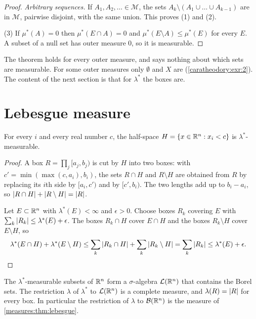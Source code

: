\begin{notechapter}
\begin{proof}
\emph{Arbitrary sequences.} If $A_1, A_2, \dots\in\mathcal M$, the
sets $A_k\setminus(A_1\cup\dots\cup A_{k-1})$ are in $\mathcal M$,
pairwise disjoint, with the same union. This proves (1) and (2).

(3) If $\mu^*(A) = 0$ then $\mu^*(E\cap A) = 0$ and
$\mu^*(E\setminus A)\leq\mu^*(E)$ for every $E$. A subset of a null set
has outer measure $0$, so it is measurable.
\end{proof}

The theorem holds for every outer measure, and says nothing about
which sets are measurable. For some outer measures only $\emptyset$ and
$X$ are (\cref{caratheodory:exr:2}). The content of the next section is
that for $\lambda^*$ the boxes are.

\section{Lebesgue measure}\label{caratheodory:sec:lebesgue}

\begin{lemma}\label{caratheodory:lem:halfspace}
For every $i$ and every real number $c$, the half-space
$H = \{x\in\mathbb{R}^n : x_i < c\}$ is $\lambda^*$-measurable.
\end{lemma}

\begin{proof}
A box $R = \prod_j[a_j, b_j)$ is cut by $H$ into two boxes: with
$c' = \min(\max(c, a_i), b_i)$, the sets $R\cap H$ and $R\setminus H$
are obtained from $R$ by replacing its $i$th side by $[a_i, c')$ and
by $[c', b_i)$. The two lengths add up to $b_i - a_i$, so
$\left|R\cap H\right| + \left|R\setminus H\right| = \left|R\right|$.

Let $E\subset\mathbb{R}^n$ with $\lambda^*(E) < \infty$ and $\epsilon > 0$.
Choose boxes $R_k$ covering $E$ with
$\sum_k\left|R_k\right|\leq\lambda^*(E) + \epsilon$. The boxes $R_k\cap H$
cover $E\cap H$ and the boxes $R_k\setminus H$ cover $E\setminus H$,
so
\[
  \lambda^*(E\cap H) + \lambda^*(E\setminus H)
  \leq\sum_k\left|R_k\cap H\right| + \sum_k\left|R_k\setminus H\right|
  = \sum_k\left|R_k\right|\leq\lambda^*(E) + \epsilon . \qedhere
\]
\end{proof}

\begin{theorem}
\label{caratheodory:thm:lebesgue}
The $\lambda^*$-measurable subsets of $\mathbb{R}^n$ form a $\sigma$-algebra
$\mathcal L(\mathbb{R}^n)$ that contains the Borel sets. The restriction
$\lambda$ of $\lambda^*$ to $\mathcal L(\mathbb{R}^n)$ is a complete measure,
and $\lambda(R) = \left|R\right|$ for every box. In particular the restriction
of $\lambda$ to $\mathcal B(\mathbb{R}^n)$ is the measure of
\cref{measures:thm:lebesgue}.
\end{theorem}


\end{notechapter}
